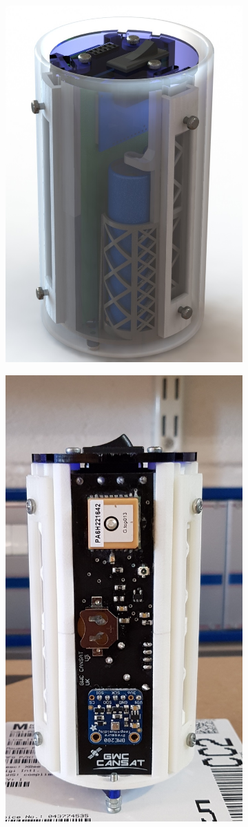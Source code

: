 \documentclass[]{report}
\begin{document}
		\begin{figure}
			\centering
			\begin{subfigure}{.5\textwidth}
				\centering
				\includegraphics[width=.8\linewidth]{CanSat_render.jpg}
			\end{subfigure}%
			\begin{subfigure}{.5\textwidth}
				\centering
				\includegraphics[width=0.6\linewidth]{new_cansat.jpg}

\end{subfigure}
\end{figure}
\end{document}
